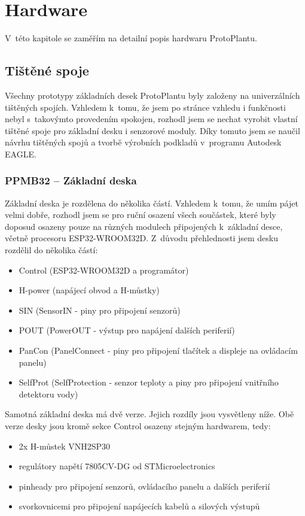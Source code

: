 \chapter{Hardware}
V~této kapitole se zaměřím na detailní popis hardwaru ProtoPlantu. 

\section{Tištěné spoje}
Všechny prototypy základních desek ProtoPlantu byly založeny na univerzálních tištěných spojích. Vzhledem k~tomu, že jsem po stránce vzhledu i funkčnosti nebyl s~takovýmto provedením spokojen, rozhodl jsem se nechat vyrobit vlastní tištěné spoje pro základní desku i senzorové moduly.
Díky tomuto jsem se naučil návrhu tištěných spojů a tvorbě výrobních podkladů v~programu Autodesk EAGLE.

\subsection{PPMB32 -- Základní deska}
Základní deska je rozdělena do několika částí. 
Vzhledem k~tomu, že umím pájet velmi dobře, rozhodl jsem se pro ruční osazení všech součástek, které byly doposud osazeny pouze na různých modulech připojených k~základní desce, včetně procesoru ESP32-WROOM32D.
Z~důvodu přehlednosti jsem desku rozdělil do několika částí:

\begin{itemize}
    \item Control (ESP32-WROOM32D a programátor)
    \item H-power (napájecí obvod a H-můstky)
    \item SIN (SensorIN - piny pro připojení senzorů)
    \item POUT (PowerOUT - výstup pro napájení dalších periferií)
    \item PanCon (PanelConnect - piny pro připojení tlačítek a displeje na ovládacím panelu)
    \item SelfProt (SelfProtection - senzor teploty a piny pro připojení vnitřního detektoru vody)
\end{itemize} 

Samotná základní deska má dvě verze. Jejich rozdíly jsou vysvětleny níže.
Obě verze desky jsou kromě sekce Control osazeny stejným hardwarem, tedy:

\begin{itemize}
    \item 2x H-můstek VNH2SP30
    \item regulátory napětí 7805CV-DG od STMicroelectronics
    \item pinheady pro připojení senzorů, ovládacího panelu a dalších periferií
    \item svorkovnicemi pro připojení napájecích kabelů a silových výstupů
\end{itemize}

